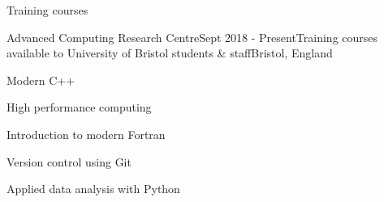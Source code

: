 \documentclass{resume} %
\begin{document}

\begin{rSection}{Training courses}
  \begin{rSubsection}{Advanced Computing Research Centre}{Sept 2018 - Present}{Training courses available to University of Bristol students \& staff}{Bristol, England}
    \item Modern C++%
    \item High performance computing%
    \item Introduction to modern Fortran
    \item Version control using Git
    \item Applied data analysis with Python
  \end{rSubsection}

\end{rSection}

%
%
\end{document}
